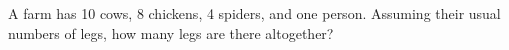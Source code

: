 A farm has 10 cows, 8 chickens, 4 spiders, and one person. Assuming their usual numbers of legs, how many legs are there altogether?
